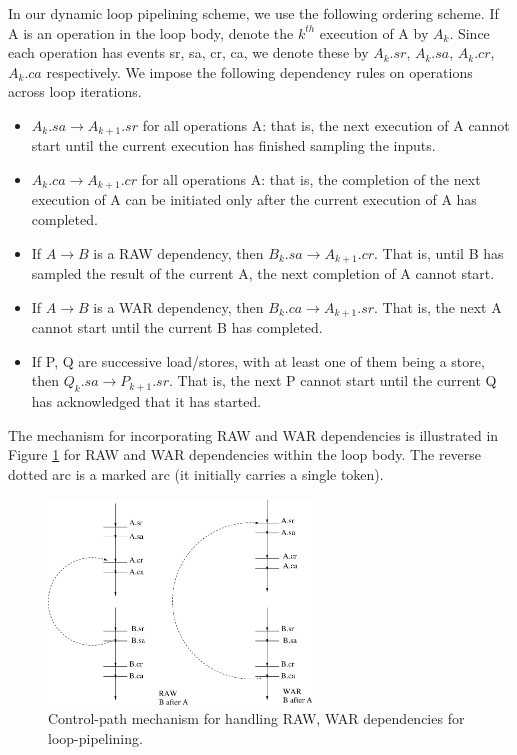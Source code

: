 \documentclass[conference]{IEEEtran}
\begin{document}
In our dynamic loop pipelining scheme, we use the
following ordering scheme.
If A is an operation in the loop body,
denote the
$k^{th}$ execution of A by $A_k$.  Since each operation
has  events sr, sa, cr, ca, we denote these by
$A_k.sr$, $A_k.sa$, $A_k.cr$, $A_k.ca$ respectively. We impose 
the following dependency rules on operations across
loop iterations.
\begin{itemize}
\item $A_k.sa \rightarrow A_{k+1}.sr$ for all operations A: that is,
the next execution of A cannot start until the current execution has
finished sampling the inputs.
\item $A_k.ca \rightarrow A_{k+1}.cr$ for all operations A: that is,
the completion of the next execution of A can be initiated only
after the current execution of A has completed.
\item If $A \rightarrow B$ is a RAW dependency, then 
$B_k.sa \rightarrow A_{k+1}.cr$.  That is, until B has
sampled the result of the current A, the next completion
of A cannot start.
\item If $A \rightarrow B$ is a WAR dependency, then
$B_k.ca \rightarrow A_{k+1}.sr$.  That is, the next
A cannot start until the current B has completed.
\item If P, Q are successive load/stores, with at least
one of them being a store, then 
$Q_k.sa \rightarrow P_{k+1}.sr$.  That is, the next P
cannot start until the current Q has acknowledged that it
has started.
\end{itemize}
The mechanism for incorporating RAW and WAR dependencies is
illustrated in Figure \ref{fig:pipelineMechanism}
for RAW and WAR dependencies within the loop body.
The reverse dotted arc is a marked arc (it initially
carries a single token).
\begin{figure}[ht]
  \centering
  \includegraphics[width=7cm]{pipelineMechanism.eps}
  \caption{Control-path mechanism for handling RAW, WAR dependencies for loop-pipelining.}
  \label{fig:pipelineMechanism}
\end{figure}
\end{document}
